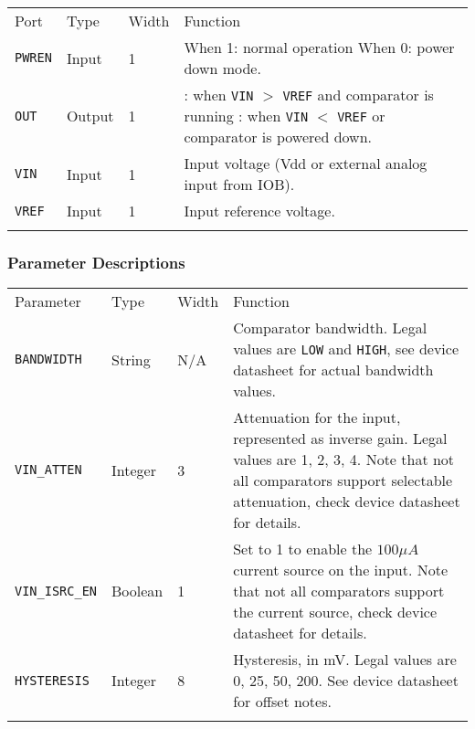\documentclass[11pt]{article}
\newcommand{\tokenstyle}[1]{\texttt{#1}}
\newcommand{\valuestyle}[1]{\texttt{#1}}
\newcommand{\strvaluestyle}[1]{\valuestyle{\textquotedbl#1\textquotedbl}}
\newcommand{\whenstyle}[1]{{\fontseries{sb}\selectfont#1}}
\newcommand{\thinhline}{\Xhline{1\arrayrulewidth}}
\newcommand{\thickhline}{\Xhline{2.5\arrayrulewidth}}
\begin{document}
\begin{tabularx}{\textwidth}{lllX}
\thinhline
\whenstyle{Port} & \whenstyle{Type} & \whenstyle{Width} & \whenstyle{Function} \\
\thickhline
\tokenstyle{PWREN} & Input & 1 &
	\whenstyle{When 1:} normal operation \newline
	\whenstyle{When 0:} power down mode. \\
\thinhline
\tokenstyle{OUT} & Output & 1 &
	\whenstyle{1:} when \tokenstyle{VIN} $>$ \tokenstyle{VREF} and comparator is running \newline
	\whenstyle{0:} when \tokenstyle{VIN} $<$ \tokenstyle{VREF} or comparator is powered down. \\
\thinhline
\tokenstyle{VIN} & Input & 1 & Input voltage (Vdd or external analog input from IOB). \\
\thinhline
\tokenstyle{VREF} & Input & 1 & Input reference voltage. \\
\thinhline
\end{tabularx}

\subsubsection{Parameter Descriptions}

\begin{tabularx}{\textwidth}{lllX}
\thinhline
\whenstyle{Parameter} & \whenstyle{Type} & \whenstyle{Width} & \whenstyle{Function} \\
\thickhline
\tokenstyle{BANDWIDTH} & String & N/A &
	Comparator bandwidth. Legal values are \strvaluestyle{LOW} and \strvaluestyle{HIGH}, see device datasheet for actual bandwidth values. \\
\thinhline
\tokenstyle{VIN\_ATTEN} & Integer & 3 &
	Attenuation for the input, represented as inverse gain. Legal values are 1, 2, 3, 4. Note that not all comparators support selectable attenuation, check device datasheet for details.\\
\thinhline
\tokenstyle{VIN\_ISRC\_EN} & Boolean & 1 &
	Set to 1 to enable the $100 \mu A$ current source on the input. Note that not all comparators support the current
	source, check device datasheet for details.\\
\thinhline
\tokenstyle{HYSTERESIS} & Integer & 8 &
	Hysteresis, in mV. Legal values are 0, 25, 50, 200. See device datasheet for offset notes.\\
\thinhline
\end{tabularx}
\end{document}

